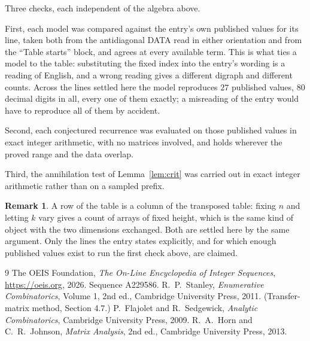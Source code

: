 \documentclass[11pt,a4paper]{article}
\theoremstyle{plain}
\theoremstyle{definition}
\newtheorem{remark}[theorem]{Remark}
\begin{document}
Three checks, each independent of the algebra above.

First, each model was compared against the entry's own published values for its line, taken
both from the antidiagonal DATA read in either orientation and from the ``Table starts''
block, and agrees at every available term. This is what ties a model to the table:
substituting the fixed index into the entry's wording is a reading of English, and a wrong
reading gives a different digraph and different counts. Across the lines settled here the
model reproduces $27$ published values, $80$ decimal digits in all, every one of
them exactly; a misreading of the entry would have to reproduce all of them by accident.

Second, each conjectured recurrence was evaluated on those published values in exact
integer arithmetic, with no matrices involved, and holds wherever the proved range and the
data overlap.

Third, the annihilation test of Lemma~\ref{lem:crit} was carried out in exact integer
arithmetic rather than on a sampled prefix.

\begin{remark}
A row of the table is a column of the transposed table: fixing $n$ and letting $k$ vary gives a
count of arrays of fixed height, which is the same kind of object with the two dimensions
exchanged. Both are settled here by the same argument. Only the lines the entry states
explicitly, and for which enough published values exist to run the first check above, are
claimed.
\end{remark}

\begin{thebibliography}{9}
 The OEIS Foundation, \emph{The On-Line Encyclopedia of Integer
Sequences}, \url{https://oeis.org}, 2026. Sequence A229586.
 R.~P.~Stanley, \emph{Enumerative Combinatorics}, Volume 1, 2nd ed.,
Cambridge University Press, 2011. (Transfer-matrix method, Section 4.7.)
 P.~Flajolet and R.~Sedgewick, \emph{Analytic Combinatorics}, Cambridge
University Press, 2009.
 R.~A.~Horn and C.~R.~Johnson, \emph{Matrix Analysis}, 2nd ed., Cambridge
University Press, 2013.
\end{thebibliography}
\end{document}
